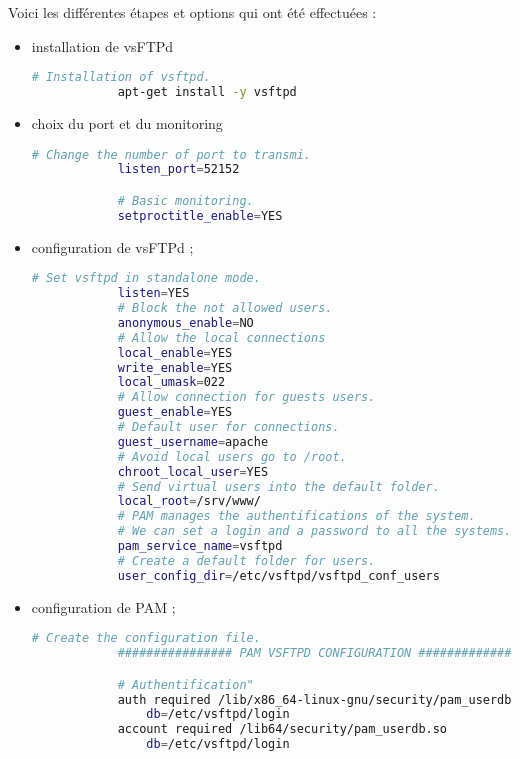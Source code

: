 Voici les différentes étapes et options qui ont été effectuées :
\begin{itemize}
    \item installation de vsFTPd

        \begin{lstlisting}[language=bash]
            # Installation of vsftpd.
            apt-get install -y vsftpd
        \end{lstlisting}

    \item choix du port et du monitoring

        \begin{lstlisting}[language=bash]
            # Change the number of port to transmi.
            listen_port=52152

            # Basic monitoring.
            setproctitle_enable=YES
        \end{lstlisting}

    \newpage
    \item configuration de vsFTPd ;

        \begin{lstlisting}[language=bash]
            # Set vsftpd in standalone mode.
            listen=YES
            # Block the not allowed users.
            anonymous_enable=NO
            # Allow the local connections
            local_enable=YES
            write_enable=YES
            local_umask=022
            # Allow connection for guests users.
            guest_enable=YES
            # Default user for connections.
            guest_username=apache
            # Avoid local users go to /root.
            chroot_local_user=YES
            # Send virtual users into the default folder.
            local_root=/srv/www/
            # PAM manages the authentifications of the system.
            # We can set a login and a password to all the systems.
            pam_service_name=vsftpd
            # Create a default folder for users.
            user_config_dir=/etc/vsftpd/vsftpd_conf_users
        \end{lstlisting}

    \item configuration de PAM ;

        \begin{lstlisting}[language=bash]
            # Create the configuration file.
            ################ PAM VSFTPD CONFIGURATION ###############

            # Authentification"
            auth required /lib/x86_64-linux-gnu/security/pam_userdb.so
                db=/etc/vsftpd/login
            account required /lib64/security/pam_userdb.so
                db=/etc/vsftpd/login
        \end{lstlisting}

\end{itemize}


